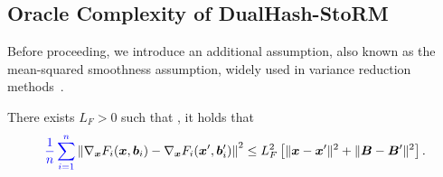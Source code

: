 \subsection{Oracle Complexity of DualHash-StoRM}
 Before proceeding, we introduce an additional assumption, also known as the mean-squared smoothness
assumption, widely used in variance reduction methods~\cite{arjevani2023lower,fang2018spider,tran2020hybridvrsgd,driggs2021stochastic}.
\begin{assumption}
\label{Ass: the mean squared smoothness of F}
There exists $L_{F} > 0$ such that  , it holds that
\begin{align}
    \label{eq:mss}
    \blue{\frac{1}{n}\sum_{i=1}^{n}}
    \left\| \nabla_{\bx} F_{i}(\bx,\bb_i) - \nabla_{\bx} F_{i}(\bx',\bb_i')\right\|^{2}
    \leq L^{2}_F \left[ \|\bx - \bx'\|^{2} + \|\bB - \bB'\|^{2} \right].
\end{align}
\end{assumption} 

